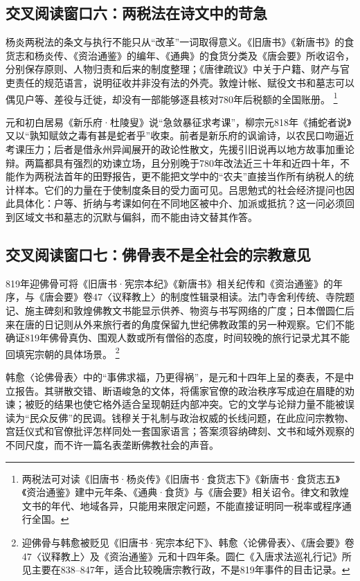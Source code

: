 \subsection{交叉阅读窗口六：两税法在诗文中的苛急}

杨炎两税法的条文与执行不能只从“改革”一词取得意义。《旧唐书》《新唐书》的食货志和杨炎传、《资治通鉴》的编年、《通典》的食货分类及《唐会要》所收诏令，分别保存原则、人物归责和后来的制度整理；《唐律疏议》中关于户籍、财产与官吏责任的规范语言，说明征收并非没有法的外壳。敦煌计帐、赋役文书和墓志可以偶见户等、差役与迁徙，却没有一部能够逐县核对780年后税额的全国账册。%
\footnote{两税法可对读《旧唐书·杨炎传》《旧唐书·食货志下》《新唐书·食货志五》《资治通鉴》建中元年条、《通典·食货》与《唐会要》相关诏令。律文和敦煌文书的年代、地域各异，只能用来限定问题，不能直接证明同一税率或程序通行全国。}

元和初白居易《新乐府·杜陵叟》说“急敛暴征求考课”，柳宗元818年《捕蛇者说》又以“孰知赋敛之毒有甚是蛇者乎”收束。前者是新乐府的讽谕诗，以农民口吻逼近考课压力；后者是借永州异闻展开的政论性散文，先援引旧说再以地方故事加重论辩。两篇都具有强烈的劝谏立场，且分别晚于780年改法近三十年和近四十年，不能作为两税法首年的田野报告，更不能把文学中的“农夫”直接当作所有纳税人的统计样本。它们的力量在于使制度条目的受力面可见。吕思勉式的社会经济提问也因此具体化：户等、折纳与考课如何在不同地区被中介、加派或抵抗？这一问必须回到区域文书和墓志的沉默与偏斜，而不能由诗文替其作答。

\subsection{交叉阅读窗口七：佛骨表不是全社会的宗教意见}

819年迎佛骨可将《旧唐书·宪宗本纪》《新唐书》相关纪传和《资治通鉴》的年序，与《唐会要》卷47〈议释教上〉的制度性辑录相读。法门寺舍利传统、寺院题记、施主碑刻和敦煌佛教文书能显示供养、物资与书写网络的广度；日本僧圆仁后来在唐的日记则从外来旅行者的角度保留九世纪佛教政策的另一种观察。它们不能确证819年佛骨真伪、围观人数或所有僧俗的态度，时间较晚的旅行记录尤其不能回填宪宗朝的具体场景。%
\footnote{迎佛骨与韩愈被贬见《旧唐书·宪宗本纪下》、韩愈〈论佛骨表〉、《唐会要》卷47〈议释教上〉及《资治通鉴》元和十四年条。圆仁《入唐求法巡礼行记》所见主要在838--847年，适合比较晚唐宗教行政，不是819年事件的目击记录。}

韩愈〈论佛骨表〉中的“事佛求福，乃更得祸”，是元和十四年上呈的奏表，不是中立报告。其骈散交错、断语峻急的文体，将儒家官僚的政治秩序写成迫在眉睫的劝谏；被贬的结果也使它格外适合呈现朝廷内部冲突。它的文学与论辩力量不能被误读为“民众反佛”的民调。钱穆关于礼制与政治权威的长线问题，在此应问宗教物、宫廷仪式和官僚批评怎样同处一套国家语言；答案须容纳碑刻、文书和域外观察的不同尺度，而不许一篇名表垄断佛教社会的声音。
